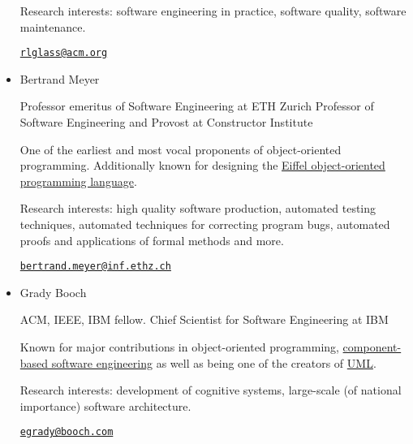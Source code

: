 \documentclass[a4paper]{article}
\begin{document}
\begin{itemize}
                Research interests: software engineering in practice, software quality, software maintenance.

                \href{mailto:rlglass@acm.org}{\texttt{rlglass@acm.org}}
                
                \item
                Bertrand Meyer

                Professor emeritus of Software Engineering at ETH Zurich
                Professor of Software Engineering and Provost at Constructor Institute

                One of the earliest and most vocal proponents of object-oriented programming.
                Additionally known for designing the \href{https://en.wikipedia.org/wiki/Eiffel_(programming_language)}{Eiffel object-oriented programming language}.
                
                Research interests: high quality software production, automated testing techniques, automated techniques for correcting program bugs, automated proofs and applications of formal methods and more.

                \href{mailto:bertrand.meyer@inf.ethz.ch}{\texttt{bertrand.meyer@inf.ethz.ch}}

                \item
                Grady Booch

                ACM, IEEE, IBM fellow.
                Chief Scientist for Software Engineering at IBM

                Known for major contributions in object-oriented programming, \href{https://en.wikipedia.org/wiki/Component-based_software_engineering}{component-based software engineering} as well as being one of the creators of \href{https://en.wikipedia.org/wiki/Unified_Modeling_Language}{UML}.
                
                Research interests: development of cognitive systems, large-scale (of national importance) software architecture.

                \href{mailto:egrady@booch.com}{\texttt{egrady@booch.com}}


\end{itemize}
\end{document}
